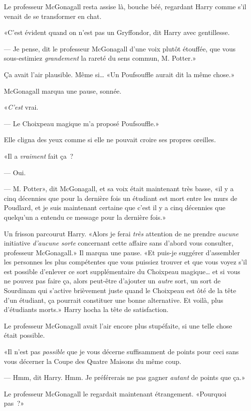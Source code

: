 Le professeur McGonagall resta assise là, bouche béé, regardant Harry comme s'il venait de se transformer en chat.

«C'est évident quand on n'est pas un Gryffondor, dit Harry avec gentillesse.

--- Je pense, dit le professeur McGonagall d'une voix plutôt étouffée, que vous sous-estimiez \emph{grandement} la rareté du sens commun, M. Potter.»

Ça avait l'air plausible. Même si… «Un Poufsouffle aurait dit la même chose.»

McGonagall marqua une pause, sonnée.

«\emph{C'est} vrai.

--- Le Choixpeau magique m'a proposé Poufsouffle.»

Elle cligna des yeux comme si elle ne pouvait croire ses propres oreilles.

«Il a \emph{vraiment} fait ça~?

--- Oui.

--- M. Potter», dit McGonagall, et sa voix était maintenant très basse, «il y a cinq décennies que pour la dernière fois un étudiant est mort entre les murs de Poudlard, et je suis maintenant certaine que c'est il y a cinq décennies que quelqu'un a entendu ce message pour la dernière fois.»

Un frisson parcourut Harry. «Alors je ferai \emph{très} attention de ne prendre \emph{aucune} initiative \emph{d'aucune sorte} concernant cette affaire sans d'abord vous consulter, professeur McGonagall.» Il marqua une pause. «Et puis-je suggérer d'assembler les personnes les plus compétentes que vous puissiez trouver et que vous voyez s'il est possible d'enlever ce sort supplémentaire du Choixpeau magique… et si vous ne pouvez pas faire ça, alors peut-être d'ajouter un \emph{autre} sort, un sort de Sourdinam qui s'active brièvement juste quand le Choixpeau est ôté de la tête d'un étudiant, ça pourrait constituer une bonne alternative. Et voilà, plus d'étudiants morts.» Harry hocha la tête de satisfaction.

Le professeur McGonagall avait l'air encore plus stupéfaite, si une telle chose était possible.

«Il n'est pas \emph{possible} que je vous décerne suffisamment de points pour ceci sans vous décerner la Coupe des Quatre Maisons du même coup.

--- Hmm, dit Harry. Hmm. Je préférerais ne pas gagner \emph{autant} de points que ça.»

Le professeur McGonagall le regardait maintenant étrangement. «Pourquoi pas~?»

